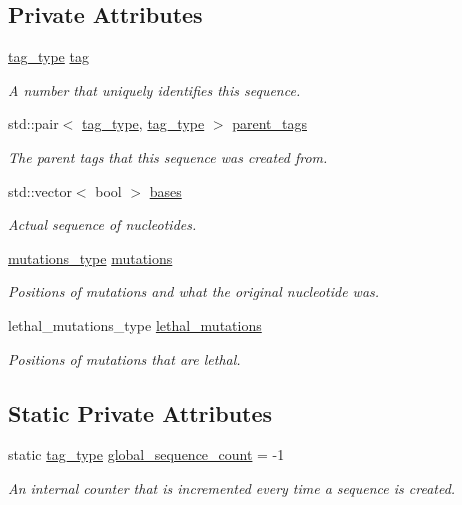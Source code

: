 \subsection*{Private Attributes}
\begin{DoxyCompactItemize}
\item 
\hyperlink{constants_8h_afd7c6eb4293e8c4d12827609a9a34b9b}{tag\+\_\+type} \hyperlink{classretrocombinator_1_1Sequence_ae599e85a84a78e23d33f6c3085248726}{tag}
\begin{DoxyCompactList}\small\item\em A number that uniquely identifies this sequence. \end{DoxyCompactList}\item 
std\+::pair$<$ \hyperlink{constants_8h_afd7c6eb4293e8c4d12827609a9a34b9b}{tag\+\_\+type}, \hyperlink{constants_8h_afd7c6eb4293e8c4d12827609a9a34b9b}{tag\+\_\+type} $>$ \hyperlink{classretrocombinator_1_1Sequence_a023fef0801bd63048bf5c7b2442694cc}{parent\+\_\+tags}
\begin{DoxyCompactList}\small\item\em The parent tags that this sequence was created from. \end{DoxyCompactList}\item 
std\+::vector$<$ bool $>$ \hyperlink{classretrocombinator_1_1Sequence_a7c6072eaff9990a0bcaebcfa6287e3e0}{bases}
\begin{DoxyCompactList}\small\item\em Actual sequence of nucleotides. \end{DoxyCompactList}\item 
\hyperlink{classretrocombinator_1_1Sequence_a2abbaf2376f035a997e02c4afae9f476}{mutations\+\_\+type} \hyperlink{classretrocombinator_1_1Sequence_a07dd3101f7838d76300313ecfb97f3fc}{mutations}
\begin{DoxyCompactList}\small\item\em Positions of mutations and what the {\itshape original} nucleotide was. \end{DoxyCompactList}\item 
lethal\+\_\+mutations\+\_\+type \hyperlink{classretrocombinator_1_1Sequence_af5798b014aaeb7573197602dafb98818}{lethal\+\_\+mutations}
\begin{DoxyCompactList}\small\item\em Positions of mutations that are lethal. \end{DoxyCompactList}\end{DoxyCompactItemize}
\subsection*{Static Private Attributes}
\begin{DoxyCompactItemize}
\item 
static \hyperlink{constants_8h_afd7c6eb4293e8c4d12827609a9a34b9b}{tag\+\_\+type} \hyperlink{classretrocombinator_1_1Sequence_a486f1b680452f7162ee9a895c2871f92}{global\+\_\+sequence\+\_\+count} = -\/1
\begin{DoxyCompactList}\small\item\em An internal counter that is incremented every time a sequence is created. \end{DoxyCompactList}\end{DoxyCompactItemize}

